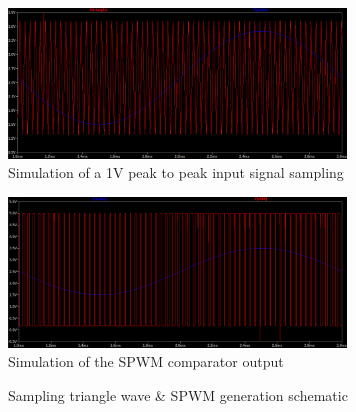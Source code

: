 \documentclass[a4paper,11pt]{article}
\begin{document}
\begin{figure}[h!]
    \centering
    \includegraphics[width=0.8\textwidth]{simulation/sampling.png}
    \caption{Simulation of a 1V peak to peak input signal sampling}
\end{figure}


\begin{figure}[h!]
    \centering
    \includegraphics[width=0.8\textwidth]{simulation/spwm_out.png}
    \caption{Simulation of the SPWM comparator output}
\end{figure}

\begin{figure}[h!]
    \centering
    \caption{Sampling triangle wave \& SPWM generation schematic}
\end{figure}
\end{document}
